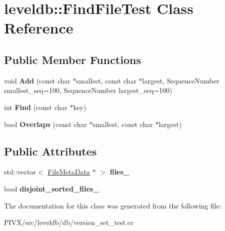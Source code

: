 \hypertarget{classleveldb_1_1_find_file_test}{}\section{leveldb\+:\+:Find\+File\+Test Class Reference}
\label{classleveldb_1_1_find_file_test}
\subsection*{Public Member Functions}
\begin{DoxyCompactItemize}
\item 
\mbox{\label{classleveldb_1_1_find_file_test_a7daf932b5d9881438c6edb5f7881901c}} 
void {\bfseries Add} (const char $\ast$smallest, const char $\ast$largest, Sequence\+Number smallest\+\_\+seq=100, Sequence\+Number largest\+\_\+seq=100)
\item 
\mbox{\label{classleveldb_1_1_find_file_test_a233fd8c1e1764f2572e03d28b1f58ae0}} 
int {\bfseries Find} (const char $\ast$key)
\item 
\mbox{\label{classleveldb_1_1_find_file_test_a617e51dc2e6acbe7d5bc6d0a7224ac51}} 
bool {\bfseries Overlaps} (const char $\ast$smallest, const char $\ast$largest)
\end{DoxyCompactItemize}
\subsection*{Public Attributes}
\begin{DoxyCompactItemize}
\item 
\mbox{\label{classleveldb_1_1_find_file_test_a53b61e6b01283c235fae219013b0e2c7}} 
std\+::vector$<$ \mbox{\hyperlink{structleveldb_1_1_file_meta_data}{File\+Meta\+Data}} $\ast$ $>$ {\bfseries files\+\_\+}
\item 
\mbox{\label{classleveldb_1_1_find_file_test_acf50512be17b9a3cd96388a8c837b8e0}} 
bool {\bfseries disjoint\+\_\+sorted\+\_\+files\+\_\+}
\end{DoxyCompactItemize}


The documentation for this class was generated from the following file\+:\begin{DoxyCompactItemize}
\item 
P\+I\+V\+X/src/leveldb/db/version\+\_\+set\+\_\+test.\+cc\end{DoxyCompactItemize}
